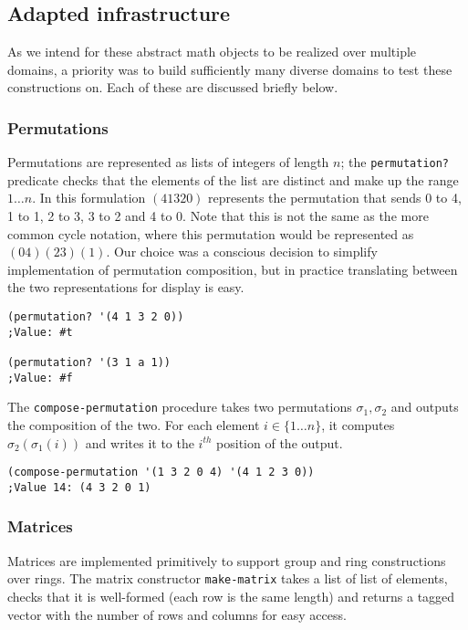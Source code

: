 \documentclass{article}
\begin{document}
        \subsection{Adapted infrastructure}
            
            As we intend for these abstract math objects to be realized over multiple domains, a priority was to build sufficiently many diverse domains to test these constructions on. Each of these are discussed briefly below.
            
            \subsubsection{Permutations}
            \label{permutations}
				
				Permutations are represented as lists of integers of length $n$; the \texttt{permutation?} predicate checks that the elements of the list are distinct and make up the range $1 \ldots n$. In this formulation $(4 1 3 2 0)$ represents the permutation that sends 0 to 4, 1 to 1, 2 to 3, 3 to 2 and 4 to 0. Note that this is not the same as the more common cycle notation, where this permutation would be represented as $(0 4) (2 3) (1)$. Our choice was a conscious decision to simplify implementation of permutation composition, but in practice translating between the two representations for display is easy.

\begin{verbatim}
(permutation? '(4 1 3 2 0))
;Value: #t

(permutation? '(3 1 a 1))
;Value: #f
\end{verbatim}
				
				The \texttt{compose-permutation} procedure takes two permutations $\sigma_1, \sigma_2$ and outputs the composition of the two. For each element $i \in \{1 \ldots n\}$, it computes $\sigma_2(\sigma_1(i))$ and writes it to the $i^{th}$ position of the output.

\begin{verbatim}
(compose-permutation '(1 3 2 0 4) '(4 1 2 3 0))
;Value 14: (4 3 2 0 1)
\end{verbatim}

            \subsubsection{Matrices}

				Matrices are implemented primitively to support group and ring constructions over rings. The matrix constructor \texttt{make-matrix} takes a list of list of elements, checks that it is well-formed (each row is the same length) and returns a tagged vector with the number of rows and columns for easy access.
\end{document}
